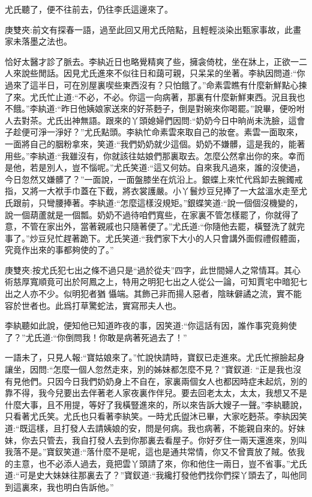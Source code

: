 \begin{parag}
    尤氏聽了，便不往前去，仍往李氏這邊來了。\begin{note}庚雙夾:前文有探春一語，過至此回又用尤氏陪點，且輕輕淡染出甄家事故，此畫家未落墨之法也。\end{note}恰好太醫才診了脈去。李紈近日也略覺精爽了些，擁衾倚枕，坐在牀上，正欲一二人來說些閒話。因見尤氏進來不似往日和藹可親，只呆呆的坐著。李紈因問道:“你過來了這半日，可在別屋裏喫些東西沒有？只怕餓了。”命素雲瞧有什麼新鮮點心揀了來。尤氏忙止道:“不必，不必。你這一向病著，那裏有什麼新鮮東西。況且我也不餓。”李紈道:“昨日他姨娘家送來的好茶麪子，倒是對碗來你喝罷。”說畢，便吩咐人去對茶。尤氏出神無語。跟來的丫頭媳婦們因問:“奶奶今日中晌尚未洗臉，這會子趁便可淨一淨好？”尤氏點頭。李紈忙命素雲來取自己的妝奩。素雲一面取來，一面將自己的胭粉拿來，笑道:“我們奶奶就少這個。奶奶不嫌髒，這是我的，能著用些。”李紈道:“我雖沒有，你就該往姑娘們那裏取去。怎麼公然拿出你的來。幸而是他，若是別人，豈不惱呢。”尤氏笑道:“這又何妨。自來我凡過來，誰的沒使過，今日忽然又嫌髒了？”一面說，一面盤膝坐在炕沿上。銀蝶上來忙代爲卸去腕鐲戒指，又將一大袱手巾蓋在下截，將衣裳護嚴。小丫鬟炒豆兒捧了一大盆溫水走至尤氏跟前，只彎腰捧著。李紈道:“怎麼這樣沒規矩。”銀蝶笑道:“說一個個沒機變的，說一個葫蘆就是一個瓢。奶奶不過待咱們寬些，在家裏不管怎樣罷了，你就得了意，不管在家出外，當著親戚也只隨著便了。”尤氏道:“你隨他去罷，橫豎洗了就完事了。”炒豆兒忙趕著跪下。尤氏笑道:“我們家下大小的人只會講外面假禮假體面，究竟作出來的事都夠使的了。”\begin{note}庚雙夾:按尤氏犯七出之條不過只是“過於從夫”四字，此世間婦人之常情耳。其心術慈厚寬順竟可出於阿鳳之上，特用之明犯七出之人從公一論，可知賈宅中暗犯七出之人亦不少。似明犯者猶 懾端。其飾己非而揚人惡者，陰昧僻譎之流，實不能容於世者也。此爲打草驚蛇法，實寫邢夫人也。\end{note}李紈聽如此說，便知他已知道昨夜的事，因笑道:“你這話有因，誰作事究竟夠使了？”尤氏道:“你倒問我！你敢是病著死過去了！”
\end{parag}


\begin{parag}
    一語未了，只見人報:“寶姑娘來了。”忙說快請時，寶釵已走進來。尤氏忙擦臉起身讓坐，因問:“怎麼一個人忽然走來，別的姊妹都怎麼不見？”寶釵道: “正是我也沒有見他們。只因今日我們奶奶身上不自在，家裏兩個女人也都因時症未起炕，別的靠不得，我今兒要出去伴著老人家夜裏作伴兒。要去回老太太，太太，我想又不是什麼大事，且不用提，等好了我橫豎進來的，所以來告訴大嫂子一聲。”李紈聽說，只看著尤氏笑。尤氏也只看著李紈笑。一時尤氏盥沐已畢，大家吃麪茶。李紈因笑道:“既這樣，且打發人去請姨娘的安，問是何病。我也病著，不能親自來的。好妹妹，你去只管去，我自打發人去到你那裏去看屋子。你好歹住一兩天還進來，別叫我落不是。”寶釵笑道:“落什麼不是呢，這也是通共常情，你又不曾賣放了賊。依我的主意，也不必添人過去，竟把雲丫頭請了來，你和他住一兩日，豈不省事。”尤氏道:“可是史大妹妹往那裏去了？”寶釵道:“我纔打發他們找你們探丫頭去了，叫他同到這裏來，我也明白告訴他。”
\end{parag}


